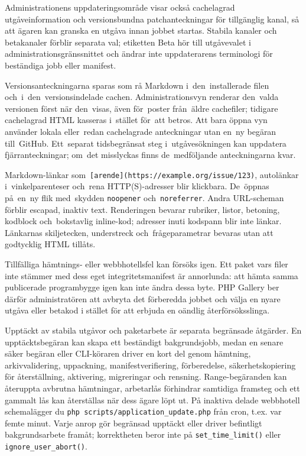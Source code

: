 \documentclass[11pt,a4paper]{article}
\newcommand{\filepath}[1]{\path{#1}}
\newcommand{\codeword}[1]{\nolinkurl{#1}}
\begin{document}
Administrationens uppdateringsområde visar också cachelagrad utgåveinformation
och versionsbundna patchanteckningar för tillgänglig kanal, så att ägaren kan
granska en utgåva innan jobbet startas. Stabila kanaler och betakanaler förblir
separata val; etiketten Beta hör till utgåvevalet i administrationsgränssnittet
och ändrar inte uppdaterarens terminologi för beständiga jobb eller manifest.

Versionsanteckningarna sparas som rå Markdown i~den~installerade filen
\filepath{PATCH_NOTES.md} och~i~den~versionsindelade cachen. Administrationsvyn
renderar den~valda versionen först när den~visas, även för~poster från~äldre
cachefiler; tidigare cachelagrad HTML kasseras i~stället för~att betros. Att
bara öppna vyn använder lokala eller~redan cachelagrade anteckningar utan en~ny
begäran till~GitHub. Ett~separat tidsbegränsat steg i~utgåvesökningen kan
uppdatera fjärranteckningar; om~det misslyckas finns de~medföljande
anteckningarna kvar.

Markdown-länkar som~\codeword{[arende](https://example.org/issue/123)},
autolänkar i~vinkelparenteser och~rena HTTP(S)-adresser blir klickbara.
De~öppnas på~en~ny flik med~skydden \codeword{noopener}
och~\codeword{noreferrer}. Andra URL-scheman förblir escapad, inaktiv text.
Renderingen bevarar rubriker, listor, betoning, kodblock och~bokstavlig
inline-kod; adresser inuti kodspann blir inte länkar. Länkarnas skiljetecken,
understreck och~frågeparametrar bevaras utan att godtycklig HTML tillåts.


Tillfälliga hämtnings- eller webbhotellsfel kan försöks igen. Ett paket vars
filer inte stämmer med dess eget integritetsmanifest är annorlunda: att hämta
samma publicerade programbygge igen kan inte ändra dessa byte. PHP Gallery ber
därför administratören att avbryta det förberedda jobbet och välja en nyare
utgåva eller betakod i stället för att erbjuda en oändlig återförsöksslinga.

Upptäckt av stabila utgåvor och paketarbete är separata begränsade åtgärder. En
upptäcktsbegäran kan skapa ett beständigt bakgrundsjobb, medan en senare säker
begäran eller CLI-köraren driver en kort del genom hämtning, arkivvalidering,
uppackning, manifestverifiering, förberedelse, säkerhetskopiering för
återställning, aktivering, migreringar och rensning. Range-begäranden kan
återuppta avbrutna hämtningar, arbetarlås förhindrar samtidiga framsteg och ett
gammalt lås kan återställas när dess ägare löpt ut. På inaktiva delade
webbhotell schemalägger du \codeword{php scripts/application_update.php} från
cron, t.ex. var femte minut. Varje anrop gör begränsad upptäckt eller driver
befintligt bakgrundsarbete framåt; korrektheten beror inte på
\codeword{set_time_limit()} eller \codeword{ignore_user_abort()}.
\end{document}
